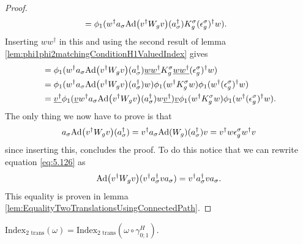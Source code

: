 \documentclass[12pt,a4paper,twoside]{article}
\numberwithin{equation}{section}
\begin{document}
\begin{proof}
\begin{align}
		&=\phi_1(w^\dagger a_\sigma \Ad{v^\dagger W_g v}(a_\sigma^\dagger)K_g^\sigma  (\epsilon_g^\sigma)^\dagger w).
	\end{align}
	Inserting $w w^\dagger$ in this and using the second result of lemma \ref{lem:phi1phi2matchingConditionH1ValuedIndex} gives
	\begin{align}
		&=\phi_1(w^\dagger a_\sigma \Ad{v^\dagger W_g v}(a_\sigma^\dagger)\underline{w w^\dagger}K_g^\sigma \underline{w w^\dagger}  (\epsilon_g^\sigma)^\dagger w)\\
		&=\phi_1(w^\dagger a_\sigma \Ad{v^\dagger W_g v}(a_\sigma^\dagger)w)\phi_1( w^\dagger K_g^\sigma w ) \phi_1( w^\dagger  (\epsilon_g^\sigma)^\dagger w)\\
		&=\underline{v^\dagger}\phi_1(\underline{v} w^\dagger a_\sigma \Ad{v^\dagger W_g v}(a_\sigma^\dagger)w \underline{v^\dagger})\underline{v}\phi_1( w^\dagger K_g^\sigma w ) \phi_1( w^\dagger  (\epsilon_g^\sigma)^\dagger w).
	\end{align}
	The only thing we now have to prove is that
	\begin{equation}\label{eq:5.126}
		a_\sigma \Ad{v^\dagger W_g v}(a_\sigma^\dagger)=v^\dagger a_\sigma \Ad{W_g}(a_\sigma^\dagger)v=v^\dagger w \epsilon_g^\sigma w^\dagger v
	\end{equation}
	since inserting this, concludes the proof. To do this notice that we can rewrite equation \eqref{eq:5.126} as
	\begin{equation}
		\Ad{v^\dagger W_g v}(v^\dagger a_\sigma^\dagger v a_\sigma)=v^\dagger a_\sigma^\dagger v a_\sigma.
	\end{equation}
	This equality is proven in lemma \ref{lem:EqualityTwoTranslationsUsingConnectedPath}.
\end{proof}
\begin{theorem}
	$\textrm{Index}_{\text{2 trans}}(\omega)=\textrm{Index}_{\text{2 trans}}(\omega\circ\gamma^H_{0;1}).$
\end{theorem}
\end{document}
